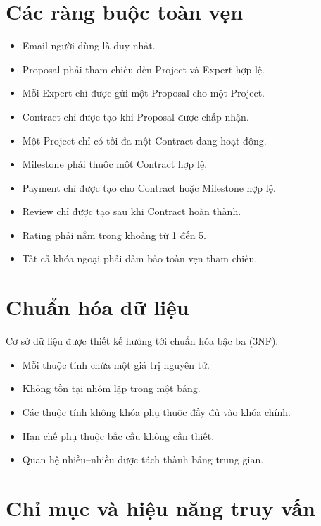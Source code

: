 \section{Các ràng buộc toàn vẹn}
\label{sec:integrity-constraints}

\begin{itemize}
    \item Email người dùng là duy nhất.
    \item Proposal phải tham chiếu đến Project và Expert hợp lệ.
    \item Mỗi Expert chỉ được gửi một Proposal cho một Project.
    \item Contract chỉ được tạo khi Proposal được chấp nhận.
    \item Một Project chỉ có tối đa một Contract đang hoạt động.
    \item Milestone phải thuộc một Contract hợp lệ.
    \item Payment chỉ được tạo cho Contract hoặc Milestone hợp lệ.
    \item Review chỉ được tạo sau khi Contract hoàn thành.
    \item Rating phải nằm trong khoảng từ 1 đến 5.
    \item Tất cả khóa ngoại phải đảm bảo toàn vẹn tham chiếu.
\end{itemize}

\section{Chuẩn hóa dữ liệu}
\label{sec:normalization}

Cơ sở dữ liệu được thiết kế hướng tới chuẩn hóa bậc ba (3NF).

\begin{itemize}
    \item Mỗi thuộc tính chứa một giá trị nguyên tử.
    \item Không tồn tại nhóm lặp trong một bảng.
    \item Các thuộc tính không khóa phụ thuộc đầy đủ vào khóa chính.
    \item Hạn chế phụ thuộc bắc cầu không cần thiết.
    \item Quan hệ nhiều--nhiều được tách thành bảng trung gian.
\end{itemize}

\section{Chỉ mục và hiệu năng truy vấn}
\label{sec:index-strategy}

